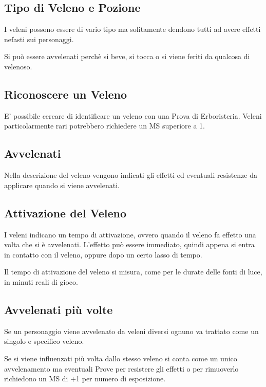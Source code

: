 \documentclass[12pt,a4paper,twoside,openany]{book}
\begin{document}
\begin{multicols}{2}

\subsection{Tipo di Veleno e Pozione}\label{tipidiveleno}

I veleni possono essere di vario tipo ma solitamente dendono tutti ad avere effetti nefasti sui personaggi.

Si può essere avvelenati perchè si beve, si tocca o si viene feriti da qualcosa di velenoso.

\subsection{Riconoscere un Veleno}

E' possibile cercare di identificare un veleno con una Prova di Erboristeria. Veleni particolarmente rari potrebbero richiedere un MS superiore a 1.

\subsection{Avvelenati}

Nella descrizione del veleno vengono indicati gli effetti ed eventuali resistenze da applicare quando si viene avvelenati.

\subsection{Attivazione del Veleno}

I veleni indicano un tempo di attivazione, ovvero quando il veleno fa effetto una volta che si è avvelenati. L'effetto può essere immediato, quindi appena si entra in contatto con il veleno, oppure dopo un certo lasso di tempo.

Il tempo di attivazione del veleno si misura, come per le durate delle fonti di luce, in minuti reali di gioco.

\subsection{Avvelenati più volte}

Se un personaggio viene avvelenato da veleni diversi ognuno va trattato come un singolo e specifico veleno.

Se si viene influenzati più volta dallo stesso veleno si conta come un unico avvelenamento ma eventuali Prove per resistere gli effetti o per rimuoverlo richiedono un MS di +1 per numero di esposizione.


\end{multicols}
\end{document}
